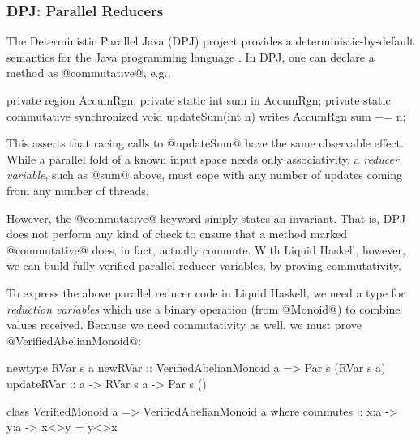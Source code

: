 \subsubsection{DPJ: Parallel Reducers}
\label{sec:reducer}

The Deterministic Parallel Java (DPJ) project provides a deterministic-by-default
semantics for the Java programming language \cite{DPJ}. In DPJ, one can declare a
method as @commutative@, e.g.,
%
\begin{code}
private region AccumRgn;
private static int sum in AccumRgn;
private static commutative synchronized
  void updateSum(int n) writes AccumRgn
   { sum += n; }
\end{code}
%
This asserts that racing calls to @updateSum@ have the same observable effect.
%
While a parallel fold of a known input space needs only associativity, a {\em
  reducer variable}, such as @sum@ above, must cope with any number of updates
coming from any number of threads.

However, the @commutative@ keyword simply states an invariant. That is, DPJ does not perform
any kind of check to ensure that a method marked @commutative@ does, in fact,
actually commute. With Liquid Haskell, however, we can build fully-verified
parallel reducer variables, by proving commutativity.

To express the above parallel reducer code in Liquid Haskell, we need a type for
{\em reduction variables} which use a binary operation (from @Monoid@) to
combine values received.  Because we need commutativity as well, we must prove
@VerifiedAbelianMonoid@:

\begin{code}
 newtype RVar s a
 newRVar :: VerifiedAbelianMonoid a
         => Par s (RVar s a)
 updateRVar :: a -> RVar s a -> Par s ()

 class VerifiedMonoid a =>
       VerifiedAbelianMonoid a where
  commutes :: x:a -> y:a -> {x<>y = y<>x}
\end{code}

